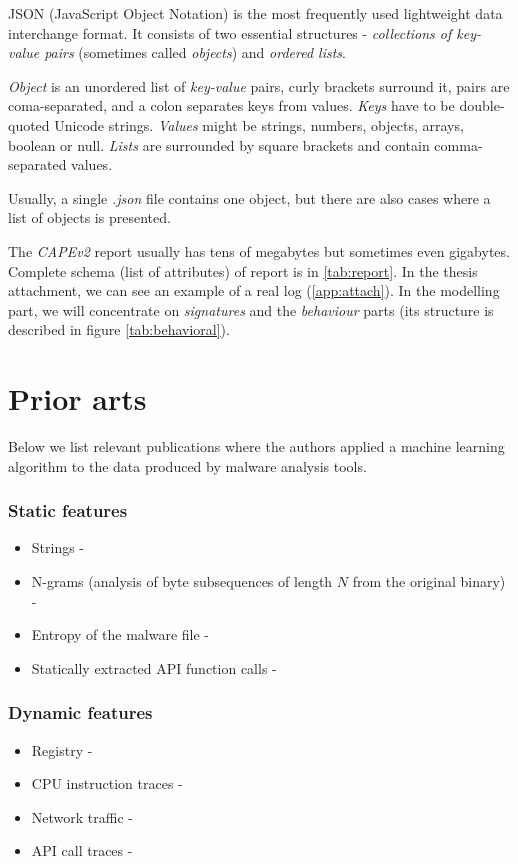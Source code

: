 JSON (JavaScript Object Notation) is the most frequently used lightweight data interchange format. It consists of two essential structures - \emph{collections of key-value pairs} (sometimes called \emph{objects}) and \emph{ordered lists}. 

\emph{Object} is an unordered list of \emph{key-value} pairs, curly brackets surround it, pairs are coma-separated, and a colon separates keys from values. \emph{Keys} have to be double-quoted Unicode strings. \emph{Values} might be strings, numbers, objects, arrays, boolean or null. \emph{Lists} are surrounded by square brackets and contain comma-separated values.

Usually, a single \emph{.json} file contains one object, but there are also cases where a list of objects is presented.

The \emph{CAPEv2} report usually has tens of megabytes but sometimes even gigabytes. Complete schema (list of attributes) of report is in \ref{tab:report}. In the thesis attachment, we can see an example of a real log (\ref{app:attach}). In the modelling part, we will concentrate on \emph{signatures} and the \emph{behaviour} parts (its structure is described in figure \ref{tab:behavioral}).


\section{Prior arts}
Below we list relevant publications where the authors applied a machine learning algorithm to the data produced by malware analysis tools.
\subsubsection*{Static features}
\begin{itemize}
  \itemsep0em 
  \item Strings - \cite{Lee2011}
  \item N-grams (analysis of byte subsequences of length $N$ from the original binary) - \cite{Fuyong2017}
  \item Entropy of the malware file - \cite{Wojnowicz2018}
  \item Statically extracted API function calls - \cite{Ahmadi2016}
\end{itemize}

\subsubsection*{Dynamic features}
\begin{itemize}
  \itemsep0em 
  \item Registry - \cite{Ghiasi2015}
  \item CPU instruction traces - \cite{Carlin2017}
  \item Network traffic - \cite{Boukhtouta2015}
  \item API call traces -  \cite{Galal2015}
\end{itemize}

